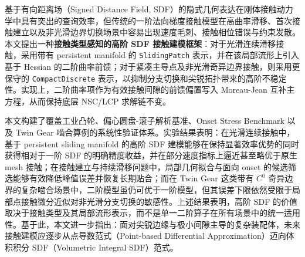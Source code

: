 基于有向距离场（Signed Distance Field, SDF）的隐式几何表达在刚体接触动力学中具有突出的查询效率，但传统的一阶法向梯度接触模型在高曲率滑移、首次接触建立以及非光滑边界切换场景中容易出现速度毛刺、接触相位错误与约束发散。本文提出一种\textbf{接触类型感知的高阶 SDF 接触建模框架}：对于光滑连续滑移接触，采用带有 persistent manifold 的 \texttt{SlidingPatch} 表示，并在该局部流形上引入基于 Hessian 的二阶曲率前馈；对于紧凑主导点及非光滑奇异边界接触，则采用更保守的 \texttt{CompactDiscrete} 表示，以抑制分支切换和尖锐拓扑带来的高阶不稳定性。实现上，二阶曲率项作为有效接触间隙的前馈偏置写入 Moreau-Jean 互补主方程，从而保持底层 NSC/LCP 求解链不变。

本文构建了覆盖工业凸轮、偏心圆盘-滚子解析基准、Onset Stress Benchmark 以及 Twin Gear 啮合算例的系统性验证体系。实验结果表明：在光滑连续接触中，基于 persistent sliding manifold 的高阶 SDF 建模能够在保持显著效率优势的同时获得相对于一阶 SDF 的明确精度收益，并在部分速度指标上逼近甚至略优于原生 mesh 接触；在接触建立与持续滑移问题中，局部几何拟合与面向 onset 的候选筛选能够有效降低峰值误差并恢复长期贴合；而在 Twin Gear 这类带有 $C^0$ 奇异边界的复杂啮合场景中，二阶模型虽仍可优于一阶模型，但其误差下限依然受限于局部点接触微分近似对非光滑分支切换的敏感性。上述结果表明，高阶 SDF 的价值取决于接触类型及其局部流形表示，而不是单一二阶算子在所有场景中的统一适用性。基于此，本文进一步指出：面对尖锐边缘与极小间隙主导的复杂装配体，未来接触建模应逐步从点导数范式（Point-based Differential Approximation）迈向体积积分 SDF（Volumetric Integral SDF）范式。
